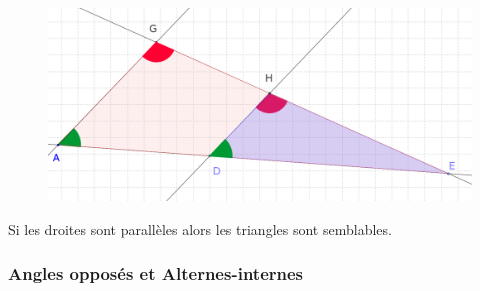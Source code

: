 \documentclass[11pt]{article}
\begin{document}
  \begin{figure}[H]
    \centering
    \includegraphics[width=0.5\linewidth]{3x6-thales/sources/dr-2.png}
  \end{figure}

  \begin{center}Si les droites sont parallèles alors les triangles sont semblables.\end{center}



\subsubsection*{Angles opposés et Alternes-internes}
\end{document}
